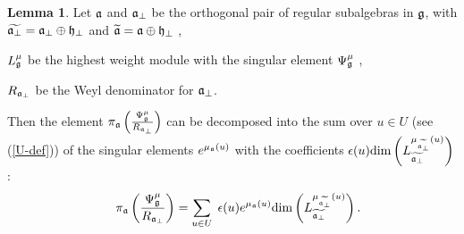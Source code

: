 \documentclass[12pt]{iopart}
\theoremstyle{definition}
\newtheorem{lemma}{Lemma}
\theoremstyle{definition}
\theoremstyle{definition}
\theoremstyle{definition}
\begin{document}
\begin{lemma}
Let $\frak{a}$ and $\frak{a}_{\perp }$ be the orthogonal pair of regular
subalgebras in $\frak{g}$, with $\widetilde{\frak{a}_{\perp }}=\frak{a}%
_{\perp }\oplus \frak{h}_{\perp }$ and $\widetilde{\frak{a}}=\frak{a}\oplus
\frak{h}_{\perp }$ ,

$L_{\frak{g}}^{\mu }$ be the highest weight module with the singular element
$\Psi _{\frak{g}}^{\mu }$ ,

$R_{\frak{a}_{\perp }}$ be the Weyl denominator for $\frak{a}_{\perp }$.

Then the element $\pi _{\frak{a}}\left( \frac{\Psi _{\frak{g}}^{\mu }}{R_{%
\frak{a}_{\perp }}}\right) $ can be decomposed into the sum over $u\in U$ (see (\ref{U-def})) of
the singular elements $e^{\mu _{\frak{a}}\left( u\right) }$ with the
coefficients $\epsilon (u)\mathrm{\dim }\left( L_{\widetilde{\frak{a}_{\perp
}}}^{\mu _{\widetilde{\frak{a}_{\perp }}}\left( u\right) }\right) $:
\begin{equation}
\quad \pi _{\frak{a}}\left( \frac{\Psi _{\frak{g}}^{\mu }}{R_{\frak{a}%
_{\perp }}}\right) =\sum_{u\in U}\;\epsilon (u)e^{\mu _{\frak{a}}\left(
u\right) }\mathrm{\dim }\left( L_{\widetilde{\frak{a}_{\perp }}}^{\mu _{%
\widetilde{\frak{a}_{\perp }}}\left( u\right) }\right) .
\end{equation}
\end{lemma}
\end{document}
